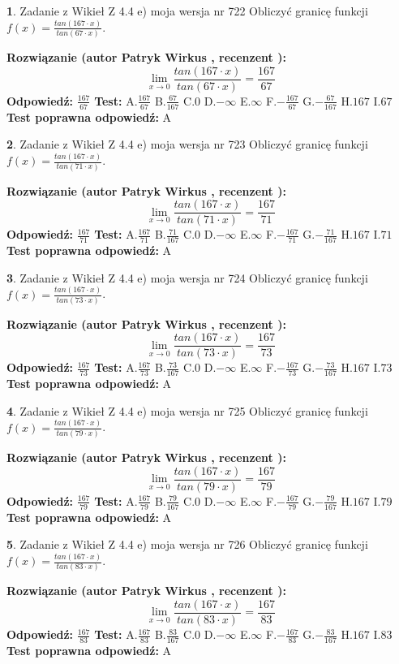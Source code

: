 \documentclass[12pt, a4paper]{article}
\theoremstyle{definition} %
\newtheorem{zad}{}
\newcommand{\zadStart}[1]{\begin{zad}#1\newline}
\newcommand{\zadStop}{\end{zad}}
\newcommand{\rozwStart}[2]{\noindent \textbf{Rozwiązanie (autor #1 , recenzent #2): }\newline}
\newcommand{\rozwStop}{\newline}
\newcommand{\odpStart}{\noindent \textbf{Odpowiedź:}\newline}
\newcommand{\odpStop}{\newline}
\newcommand{\testStart}{\noindent \textbf{Test:}\newline}
\newcommand{\testStop}{\newline}
\newcommand{\kluczStart}{\noindent \textbf{Test poprawna odpowiedź:}\newline}
\newcommand{\kluczStop}{\newline}
\begin{document}
\zadStart{Zadanie z Wikieł Z 4.4 e) moja wersja nr 722}
Obliczyć granicę funkcji $f(x)=\frac{tan(167\cdot x)}{tan(67\cdot x)}$.
\zadStop
\rozwStart{Patryk Wirkus}{}
$$\lim\limits_{x\to 0}\frac{tan(167\cdot x)}{tan(67\cdot x)}=
\frac{167}{67}$$
\rozwStop
\odpStart
$\frac{167}{67}$
\odpStop
\testStart
A.$\frac{167}{67}$
B.$\frac{67}{167}$
C.$0$
D.$-\infty$
E.$\infty$
F.$-\frac{167}{67}$
G.$-\frac{67}{167}$
H.$167$
I.$67$
\testStop
\kluczStart
A
\kluczStop



\zadStart{Zadanie z Wikieł Z 4.4 e) moja wersja nr 723}
Obliczyć granicę funkcji $f(x)=\frac{tan(167\cdot x)}{tan(71\cdot x)}$.
\zadStop
\rozwStart{Patryk Wirkus}{}
$$\lim\limits_{x\to 0}\frac{tan(167\cdot x)}{tan(71\cdot x)}=
\frac{167}{71}$$
\rozwStop
\odpStart
$\frac{167}{71}$
\odpStop
\testStart
A.$\frac{167}{71}$
B.$\frac{71}{167}$
C.$0$
D.$-\infty$
E.$\infty$
F.$-\frac{167}{71}$
G.$-\frac{71}{167}$
H.$167$
I.$71$
\testStop
\kluczStart
A
\kluczStop



\zadStart{Zadanie z Wikieł Z 4.4 e) moja wersja nr 724}
Obliczyć granicę funkcji $f(x)=\frac{tan(167\cdot x)}{tan(73\cdot x)}$.
\zadStop
\rozwStart{Patryk Wirkus}{}
$$\lim\limits_{x\to 0}\frac{tan(167\cdot x)}{tan(73\cdot x)}=
\frac{167}{73}$$
\rozwStop
\odpStart
$\frac{167}{73}$
\odpStop
\testStart
A.$\frac{167}{73}$
B.$\frac{73}{167}$
C.$0$
D.$-\infty$
E.$\infty$
F.$-\frac{167}{73}$
G.$-\frac{73}{167}$
H.$167$
I.$73$
\testStop
\kluczStart
A
\kluczStop



\zadStart{Zadanie z Wikieł Z 4.4 e) moja wersja nr 725}
Obliczyć granicę funkcji $f(x)=\frac{tan(167\cdot x)}{tan(79\cdot x)}$.
\zadStop
\rozwStart{Patryk Wirkus}{}
$$\lim\limits_{x\to 0}\frac{tan(167\cdot x)}{tan(79\cdot x)}=
\frac{167}{79}$$
\rozwStop
\odpStart
$\frac{167}{79}$
\odpStop
\testStart
A.$\frac{167}{79}$
B.$\frac{79}{167}$
C.$0$
D.$-\infty$
E.$\infty$
F.$-\frac{167}{79}$
G.$-\frac{79}{167}$
H.$167$
I.$79$
\testStop
\kluczStart
A
\kluczStop



\zadStart{Zadanie z Wikieł Z 4.4 e) moja wersja nr 726}
Obliczyć granicę funkcji $f(x)=\frac{tan(167\cdot x)}{tan(83\cdot x)}$.
\zadStop
\rozwStart{Patryk Wirkus}{}
$$\lim\limits_{x\to 0}\frac{tan(167\cdot x)}{tan(83\cdot x)}=
\frac{167}{83}$$
\rozwStop
\odpStart
$\frac{167}{83}$
\odpStop
\testStart
A.$\frac{167}{83}$
B.$\frac{83}{167}$
C.$0$
D.$-\infty$
E.$\infty$
F.$-\frac{167}{83}$
G.$-\frac{83}{167}$
H.$167$
I.$83$
\testStop
\kluczStart
A
\kluczStop
\end{document}
